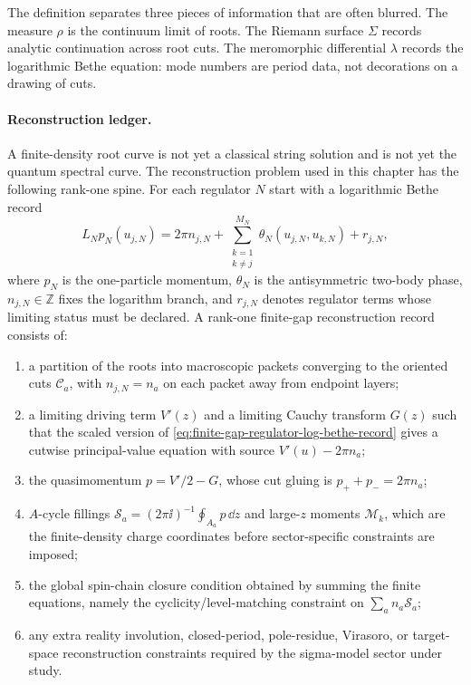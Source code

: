 The definition separates three pieces of information that are often blurred.
The measure \(\rho\) is the continuum limit of roots.  The Riemann surface
\(\Sigma\) records analytic continuation across root cuts.  The meromorphic
differential \(\lambda\) records the logarithmic Bethe equation: mode numbers
are period data, not decorations on a drawing of cuts.

\paragraph{Reconstruction ledger.}
A finite-density root curve is not yet a classical string solution and is not
yet the quantum spectral curve.  The reconstruction problem used in this
chapter has the following rank-one spine.  For each regulator \(N\) start with
a logarithmic Bethe record
\begin{equation}
  L_N p_N(u_{j,N})
  =
  2\pi n_{j,N}
  +
  \sum_{\substack{k=1\\ k\ne j}}^{M_N}
  \theta_N(u_{j,N},u_{k,N})
  +
  r_{j,N},
  \label{eq:finite-gap-regulator-log-bethe-record}
\end{equation}
where \(p_N\) is the one-particle momentum, \(\theta_N\) is the
antisymmetric two-body phase, \(n_{j,N}\in\mathbb Z\) fixes the logarithm
branch, and \(r_{j,N}\) denotes regulator terms whose limiting status must be
declared.  A rank-one finite-gap reconstruction record consists of:
\begin{enumerate}
\item a partition of the roots into macroscopic packets converging to the
  oriented cuts \(\mathcal C_a\), with \(n_{j,N}=n_a\) on each packet away
  from endpoint layers;
\item a limiting driving term \(V'(z)\) and a limiting Cauchy transform
  \(G(z)\) such that the scaled version of
  \eqref{eq:finite-gap-regulator-log-bethe-record} gives a cutwise
  principal-value equation with source \(V'(u)-2\pi n_a\);
\item the quasimomentum \(p=V'/2-G\), whose cut gluing is
  \(p_++p_-=2\pi n_a\);
\item \(A\)-cycle fillings
  \(\mathcal S_a=(2\pi\ii)^{-1}\oint_{A_a}p\,\dd z\) and large-\(z\)
  moments \(\mathcal M_k\), which are the finite-density charge
  coordinates before sector-specific constraints are imposed;
\item the global spin-chain closure condition obtained by summing the finite
  equations, namely the cyclicity/level-matching constraint on
  \(\sum_a n_a\mathcal S_a\);
\item any extra reality involution, closed-period, pole-residue, Virasoro, or
  target-space reconstruction constraints required by the sigma-model sector
  under study.
\end{enumerate}
